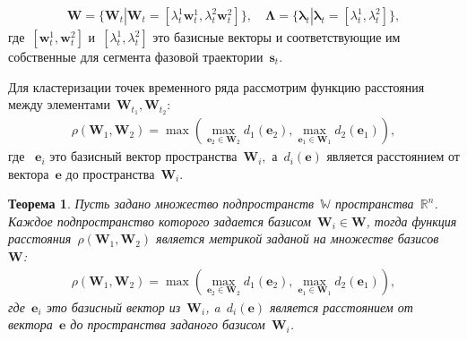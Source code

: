 \documentclass[12pt, twoside]{article}
\newtheorem{theorem}{Теорема}
\numberwithin{equation}{section}
\begin{document}
\begin{equation}
\label{eq:cl:3}
\begin{aligned}
\mathbf{W} = \{\textbf{W}_t| \textbf{W}_t = [\lambda^1_t\textbf{w}^1_t, \lambda^2_t\textbf{w}^2_t]\}, \quad \bm{\Lambda} = \{\bm{\lambda}_t| \bm{\lambda}_t=[\lambda^1_t, \lambda^2_t]\},
\end{aligned}
\end{equation}
где~$[\textbf{w}^1_t, \textbf{w}^2_t]$ и~$[\lambda^1_t, \lambda^2_t]$ это базисные векторы и соответствующие им собственные для сегмента фазовой траектории~$\textbf{s}_t$.

Для кластеризации точек временного ряда рассмотрим функцию расстояния между элементами~$\mathbf{W}_{t_1},\mathbf{W}_{t_2}$:
\begin{equation}
\label{eq:cl:4}
\begin{aligned}
\rho\left(\textbf{W}_1, \textbf{W}_2\right) = \max\left(\max_{\textbf{e}_2 \in \textbf{W}_2} d_{1}\left(\textbf{e}_2\right), \max_{\textbf{e}_1 \in \textbf{W}_1} d_{2}\left(\textbf{e}_1\right)\right),
\end{aligned}
\end{equation}
где ~$\textbf{e}_i$ это базисный вектор пространства~$\textbf{W}_i,$ а~$d_i\left(\textbf{e}\right)$ является расстоянием от вектора~$\textbf{e}$ до пространства~$\textbf{W}_i$.

\begin{theorem}
Пусть задано множество подпространств~$\mathbb{W}$ пространства~$\mathbb{R}^{n}$. Каждое подпространство которого задается базисом~$\mathbf{W}_i\in \mathbf{W}$, тогда функция расстояния~$\rho\left(\textbf{W}_1, \textbf{W}_2\right)$ является метрикой заданой на множестве базисов~$\mathbf{W}$:
\begin{equation}
\begin{aligned}
\rho\left(\textbf{W}_1, \textbf{W}_2\right) = \max\left(\max_{\textbf{e}_2 \in \textbf{W}_2} d_{1}\left(\textbf{e}_2\right), \max_{\textbf{e}_1 \in \textbf{W}_1} d_{2}\left(\textbf{e}_1\right)\right),
\end{aligned}
\end{equation}
где~$\textbf{e}_i$ это базисный вектор из~$\textbf{W}_i$, a~$d_i\left(\textbf{e}\right)$ является расстоянием от вектора~$\textbf{e}$ до пространства заданого базисом~$\textbf{W}_i$.
\end{theorem}
\end{document}

